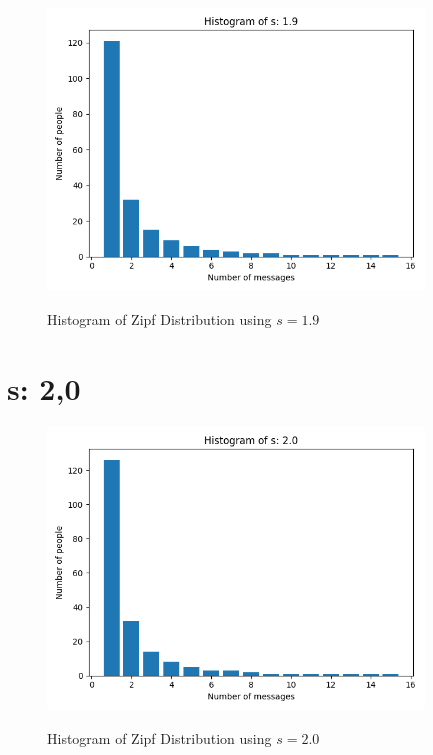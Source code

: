 \documentclass{article}
\begin{document}
\begin{figure}[H] \centering
 \includegraphics[width=10cm]{imgs/histogram-19.png}
 \label{fig:hist-19}
 \caption{Histogram of Zipf Distribution using $s=1.9$} \end{figure}




\section{s: 2,0}

\begin{figure}[H] \centering
 \includegraphics[width=10cm]{imgs/histogram-20.png}
 \label{fig:hist-20}
 \caption{Histogram of Zipf Distribution using $s=2.0$} \end{figure}


\end{document}
